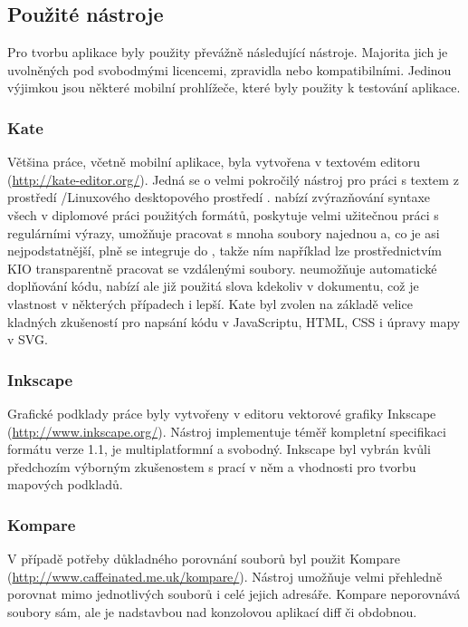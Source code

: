 \subsection{Použité nástroje}
Pro tvorbu aplikace byly použity převážně následující nástroje. Majorita jich je uvolněných pod svobodmými licencemi, zpravidla   nebo kompatibilními. Jedinou výjimkou jsou některé mobilní prohlížeče, které byly použity k testování aplikace.

\subsubsection{Kate}
Většina práce, včetně mobilní aplikace, byla vytvořena v textovém editoru  (\url{http://kate-editor.org/}). Jedná se o velmi pokročilý nástroj pro práci s textem z prostředí /Linuxového desktopového prostředí .  nabízí zvýrazňování syntaxe všech v diplomové práci použitých formátů, poskytuje velmi užitečnou práci s regulárními výrazy, umožňuje pracovat s mnoha soubory najednou a, co je asi nejpodstatnější, plně se integruje do , takže ním například lze prostřednictvím \gls{KIO} transparentně pracovat se vzdálenými soubory.  neumožňuje automatické doplňování kódu, nabízí ale již použitá slova kdekoliv v dokumentu, což je vlastnost v některých případech i lepší. Kate byl zvolen na základě velice kladných zkušeností pro napsání kódu v JavaScriptu, \gls{HTML}, \gls{CSS} i úpravy mapy v \gls{SVG}.

\subsubsection{Inkscape}
Grafické podklady práce byly vytvořeny v editoru vektorové grafiky Inkscape (\url{http://www.inkscape.org/}). Nástroj implementuje téměř kompletní specifikaci formátu  verze 1.1, je multiplatformní a svobodný. Inkscape byl vybrán kvůli předchozím výborným zkušenostem s prací v něm a vhodnosti pro tvorbu mapových podkladů.

\subsubsection{Kompare}
V případě potřeby důkladného porovnání souborů byl použit Kompare (\url{http://www.caffeinated.me.uk/kompare/}). Nástroj umožňuje velmi přehledně porovnat mimo jednotlivých souborů i celé jejich adresáře. Kompare neporovnává soubory sám, ale je nadstavbou nad konzolovou aplikací diff či obdobnou.

